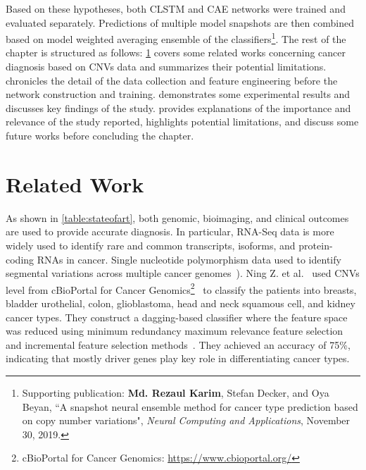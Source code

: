 \hspace*{3.5mm} Based on these hypotheses, both {CLSTM} and CAE networks were trained and evaluated separately. Predictions of multiple model snapshots are then combined based on model weighted averaging ensemble of the classifiers\footnote{Supporting publication: \textbf{Md. Rezaul Karim}, Stefan Decker, and Oya Beyan, ``A snapshot neural ensemble method for cancer type prediction based on copy number variations", \emph{Neural Computing and Applications}, November 30, 2019.}.  %
The rest of the chapter is structured as follows:
\cref{chapter_3:rw} covers some related works concerning cancer diagnosis based on CNVs data and summarizes their potential limitations.  chronicles the detail of the data collection and feature engineering before the network construction and training.  demonstrates some experimental results and discusses key findings of the study.  provides explanations of the importance and relevance of the study reported, highlights potential limitations, and discuss some future works before concluding the chapter. 

\section{Related Work}\label{chapter_3:rw}
As shown in \cref{table:stateofart}, both genomic, bioimaging, and clinical outcomes~\cite{min} are used to provide accurate diagnosis. In particular, RNA-Seq data is more widely used to identify rare and common transcripts, isoforms, and protein-coding RNAs in cancer. Single nucleotide polymorphism data used to identify segmental variations across multiple cancer genomes~\cite{82Tomczak,95Gaul}). Ning Z. et al.~\cite{zhang2016classification} used CNVs level from cBioPortal for Cancer Genomics\footnote{cBioPortal for Cancer Genomics: \url{https://www.cbioportal.org/}}~\cite{cerami2012cbio} to classify the patients into breasts, bladder urothelial, colon, glioblastoma, head and neck squamous cell, and kidney cancer types. They construct a dagging-based classifier where the feature space was reduced using minimum redundancy maximum relevance feature selection and incremental feature selection methods~\cite{zhang2016classification}. They achieved an accuracy of 75\%, indicating that mostly driver genes play key role in differentiating cancer types. 

